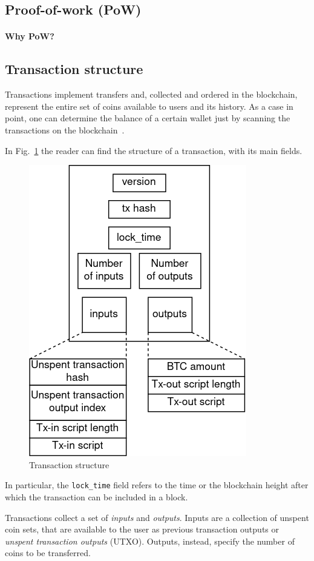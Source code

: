 \documentclass[12pt, letterpaper, twoside]{article}
\begin{document}
\subsection{Proof-of-work (PoW)}\label{sec:pow}



\paragraph{Why PoW?}\label{sec:whypow}


\subsection{Transaction structure}\label{sec:tx}

Transactions implement transfers and, collected and ordered in the blockchain, represent the entire set of coins available to users and its history. As a case in point, one can determine the balance of a certain wallet just by scanning the transactions on the blockchain~\cite{tschorsch-intro-survey}.

In Fig.~\ref{fig:tx} the reader can find the structure of a transaction, with its main fields.

\begin{figure}[h!]
	\includegraphics[width=.40\textwidth]{pict/txstruct.png}
	\centering
	\caption{Transaction structure}
	\label{fig:tx}
\end{figure}

In particular, the \texttt{lock\_time} field refers to the time or the blockchain height after which the transaction can be included in a block.

Transactions collect a set of \emph{inputs} and \emph{outputs}. Inputs are a collection of unspent coin sets, that are available to the user as previous transaction outputs or \textit{unspent transaction outputs} (UTXO). Outputs, instead, specify the number of coins to be transferred.
\end{document}
